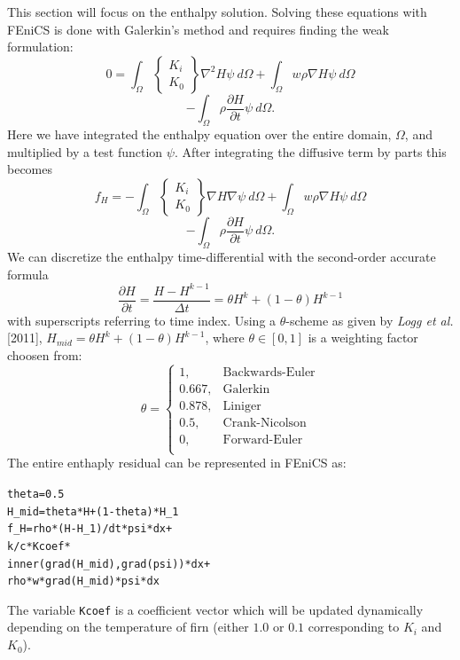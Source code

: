 \documentclass{article}%
\begin{document}
This section will focus on the enthalpy solution.  Solving these equations with FEniCS is done with Galerkin's method and requires finding the weak formulation:
  $$
    0 =
    \int_{\Omega} 
      \begin{Bmatrix}
        K_i\\
        K_0
      \end{Bmatrix}
      \nabla^2 H \psi\ d \Omega 
    + \int_{\Omega}w \rho \nabla H \psi\ d \Omega
  $$
  $$
    - \int_{\Omega} {\rho \frac{\partial H}{\partial t}} \psi\ d \Omega.
  $$
Here we have integrated the enthalpy equation over the entire domain, $\Omega$, and multiplied by a test function $\psi$.  After integrating the diffusive term by parts this becomes
  $$
    f_H =
    - \int_{\Omega} 
        \begin{Bmatrix}
          K_i\\
          K_0
        \end{Bmatrix}
        \nabla H \nabla \psi\ d \Omega 
    + \int_{\Omega}w \rho \nabla H \psi\ d \Omega
  $$
  $$
    - \int_{\Omega} {\rho \frac{\partial H}{\partial t}} \psi\ d \Omega.
  $$
We can discretize the enthalpy time-differential with the second-order accurate formula
  $$\frac{\partial H}{\partial t} = \frac{H - H^{k-1}}{\Delta t} = \theta H^{k}  + (1-\theta) H^{k-1}$$
with superscripts referring to time index.  Using a $\theta$-scheme as given by \emph{Logg et al.} [2011], $H_{mid} = \theta H^{k}  + (1-\theta) H^{k-1}$, where $\theta \in [0,1]$ is a weighting factor choosen from: 
  $$
    \theta = 
    \begin{cases}
      1,       & \text{Backwards-Euler}\\
      0.667,   & \text{Galerkin}\\
      0.878,   & \text{Liniger}\\
      0.5,     & \text{Crank-Nicolson}\\
      0,       & \text{Forward-Euler}\\
    \end{cases}
  $$
The entire enthaply residual can be represented in FEniCS as:\par
\footnotesize
\begin{alltt}
theta = 0.5
H_mid = theta*H + (1 - theta)*H_1
f_H   = rho*(H - H_1)/dt*psi*dx + 
        k/c*Kcoef*
        inner(grad(H_mid), grad(psi))*dx + 
        rho*w*grad(H_mid)*psi*dx
\end{alltt}
\normalsize
The variable \texttt{Kcoef} is a coefficient vector which will be updated dynamically depending on the temperature of firn (either $1.0$ or $0.1$ corresponding to $K_i$ and $K_0$).
\end{document}
